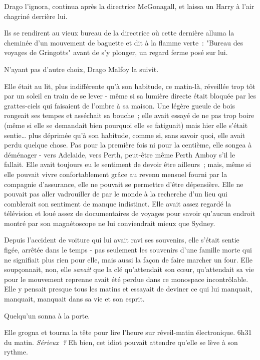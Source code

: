 Drago l'ignora, continua après la directrice McGonagall, et laissa un Harry à l'air chagriné derrière lui.

Ils se rendirent au vieux bureau de la directrice où cette dernière alluma la cheminée d'un mouvement de baguette et dit à la flamme verte~: "Bureau des voyages de Gringotts" avant de s'y plonger, un regard ferme posé sur lui.

N'ayant pas d'autre choix, Drago Malfoy la suivit.

\later

Elle était au lit, plus indifférente qu'à son habitude, ce matin-là, réveillée trop tôt par un soleil en train de se lever - même si sa lumière directe était bloquée par les grattes-ciels qui faisaient de l'ombre à sa maison. Une légère gueule de bois rongeait ses tempes et asséchait sa bouche~; elle avait essayé de ne pas trop boire (même si elle se demandait bien pourquoi elle se fatiguait) mais hier elle s'était sentie… plus déprimée qu'à son habitude, comme si, sans savoir quoi, elle avait perdu quelque chose. Pas pour la première fois ni pour la centième, elle songea à déménager - vers Adelaide, vers Perth, peut-être même Perth Amboy s'il le fallait. Elle avait toujours eu le sentiment de devoir être ailleurs~; mais, même si elle pouvait vivre confortablement grâce au revenu mensuel fourni par la compagnie d'assurance, elle ne pouvait se permettre d'être dépensière. Elle ne pouvait pas aller vadrouiller de par le monde à la recherche d'un lieu qui comblerait son sentiment de manque indistinct. Elle avait assez regardé la télévision et loué assez de documentaires de voyages pour savoir qu'aucun endroit montré par son magnétoscope ne lui conviendrait mieux que Sydney.

Depuis l'accident de voiture qui lui avait ravi ses souvenirs, elle s'était sentie figée, arrêtée dans le temps - pas seulement les souvenirs d'une famille morte qui ne signifiait plus rien pour elle, mais aussi la façon de faire marcher un four. Elle soupçonnait, non, elle \emph{savait} que la clé qu'attendait son cœur, qu'attendait sa vie pour le mouvement reprenne avait été perdue dans ce monospace incontrôlable. Elle y pensait presque tous les matins et essayait de deviner ce qui lui manquait, manquait, manquait dans sa vie et son esprit.

Quelqu'un sonna à la porte.

Elle grogna et tourna la tête pour lire l'heure sur réveil-matin électronique. 6h31 du matin. \emph{Sérieux~?} Eh bien, cet idiot pouvait attendre qu'elle se lève à son rythme.

